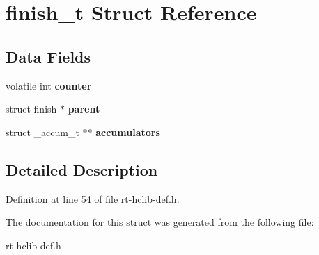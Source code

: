 \hypertarget{structfinish__t}{\section{finish\-\_\-t Struct Reference}
\label{structfinish__t}
}
\subsection*{Data Fields}
\begin{DoxyCompactItemize}
\item 
\hypertarget{structfinish__t_a495b002dadeda6cbf6c9a562437bce83}{volatile int {\bfseries counter}}\label{structfinish__t_a495b002dadeda6cbf6c9a562437bce83}

\item 
\hypertarget{structfinish__t_a00d4bb545cbb6b1298b957012a82332c}{struct finish $\ast$ {\bfseries parent}}\label{structfinish__t_a00d4bb545cbb6b1298b957012a82332c}

\item 
\hypertarget{structfinish__t_aa3c2c9880b090c5dd88eea22ad15e1ff}{struct \-\_\-accum\-\_\-t $\ast$$\ast$ {\bfseries accumulators}}\label{structfinish__t_aa3c2c9880b090c5dd88eea22ad15e1ff}

\end{DoxyCompactItemize}


\subsection{Detailed Description}


Definition at line 54 of file rt-\/hclib-\/def.\-h.



The documentation for this struct was generated from the following file\-:\begin{DoxyCompactItemize}
\item 
rt-\/hclib-\/def.\-h\end{DoxyCompactItemize}
